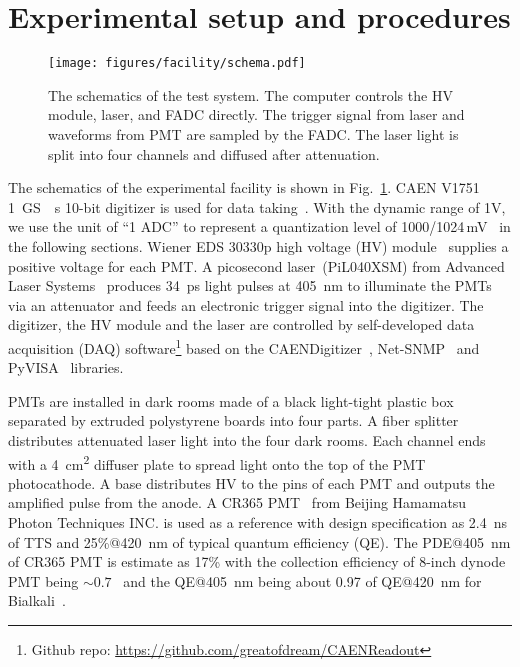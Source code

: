 \section{Experimental setup and procedures}
\label{SetUp}
\begin{figure}[!htbp]
    \centering
    \texttt{[image: figures/facility/schema.pdf]}
    \caption{The schematics of the test system. The computer controls the HV module, laser, and FADC directly. The trigger signal from laser and waveforms from PMT are sampled by the FADC. The laser light is split into four channels and diffused after attenuation.}
    \label{fig:facility}
\end{figure}

The schematics of the experimental facility is shown in Fig.~\ref{fig:facility}. CAEN V1751 \SI{1}{GS \per s} 10-bit digitizer is used for data taking~\cite{CAENV1751}. With the dynamic range of 1V, we use the unit of ``1 ADC''  to represent a quantization level of 1000/1024\,mV~\cite{JUNOPrototype} in the following sections. Wiener EDS 30330p high voltage (HV) module~\cite{WIENERHV} supplies a positive voltage for each PMT. A picosecond laser~(PiL040XSM) from Advanced Laser Systems~\cite{NTKLaser} produces \SI{34}{ps} light pulses at \SI{405}{nm} to illuminate the PMTs via an attenuator and feeds an electronic trigger signal into the digitizer. The digitizer, the HV module and the laser are controlled by self-developed data acquisition (DAQ) software\footnote{Github repo: \url{https://github.com/greatofdream/CAENReadout}} based on the CAENDigitizer~\cite{CAENLIB}, Net-SNMP~\cite{SNMP} and PyVISA~\cite{VISA} libraries.

PMTs are installed in dark rooms made of a black light-tight plastic box separated by extruded polystyrene boards into four parts. A fiber splitter distributes attenuated laser light into the four dark rooms. Each channel ends with a \SI{4}{cm\tothe{2}} diffuser plate to spread light onto the top of the PMT photocathode.
A base distributes HV to the pins of each PMT and outputs the amplified pulse from the anode. A CR365 PMT~\cite{BJBS} from Beijing Hamamatsu Photon Techniques INC. is used as a reference with design specification as \SI{2.4}{ns} of TTS and 25\%@\SI{420}{nm} of typical quantum efficiency (QE). The PDE@\SI{405}{nm} of CR365 PMT is estimate as 17\% with the collection efficiency of 8-inch dynode PMT being $\sim0.7$~\cite{R5912MOD,RCESpotlight,WANG2012113} and the QE@\SI{405}{nm} being about 0.97 of QE@\SI{420}{nm} for Bialkali~\cite{HAMAMATSUManual}.

